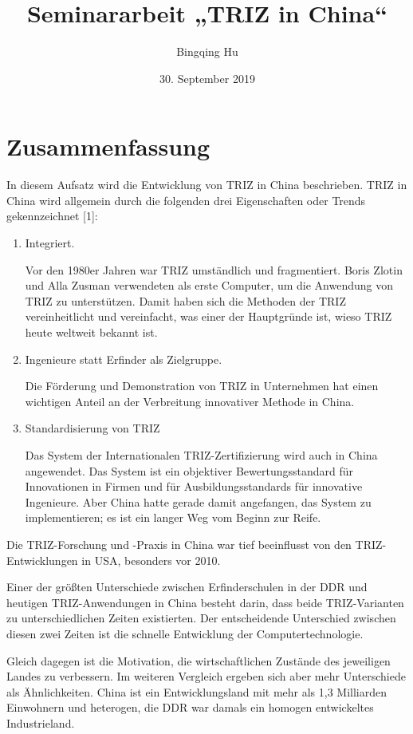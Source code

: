 \documentclass[11pt,a4paper]{article}
\title{Seminararbeit „TRIZ in China“}
\author{Bingqing Hu}
\date{30. September 2019}
\begin{document}
\maketitle
{\small \tableofcontents}

\section*{Zusammenfassung}
In diesem Aufsatz wird die Entwicklung von TRIZ in China beschrieben.  TRIZ in
China wird allgemein durch die folgenden drei Eigenschaften oder Trends
gekennzeichnet [1]:
\begin{enumerate}
\item Integriert.
  
Vor den 1980er Jahren war TRIZ umständlich und fragmentiert. Boris Zlotin und
Alla Zusman verwendeten als erste Computer, um die Anwendung von TRIZ zu
unterstützen.  Damit haben sich die Methoden der TRIZ vereinheitlicht und
vereinfacht, was einer der Hauptgründe ist, wieso TRIZ heute weltweit bekannt
ist.
\item Ingenieure statt Erfinder als Zielgruppe.
  
Die Förderung und Demonstration von TRIZ in Unternehmen hat einen wichtigen
Anteil an der Verbreitung innovativer Methode in China.
\item Standardisierung von TRIZ
  
Das System der Internationalen TRIZ-Zertifizierung wird auch in China
angewendet. Das System ist ein objektiver Bewertungsstandard für Innovationen
in Firmen und für Ausbildungsstandards für innovative Ingenieure. Aber China
hatte gerade damit angefangen, das System zu implementieren; es ist ein langer
Weg vom Beginn zur Reife.
\end{enumerate}

Die TRIZ-Forschung und -Praxis in China war tief beeinflusst von den
TRIZ-Entwicklungen in USA, besonders vor 2010.

Einer der größten Unterschiede zwischen Erfinderschulen in der DDR und
heutigen TRIZ-Anwendungen in China besteht darin, dass beide TRIZ-Varianten zu
unterschiedlichen Zeiten existierten.  Der entscheidende Unterschied zwischen
diesen zwei Zeiten ist die schnelle Entwicklung der Computertechnologie.

Gleich dagegen ist die Motivation, die wirtschaftlichen Zustände des
jeweiligen Landes zu verbessern.  Im weiteren Vergleich ergeben sich aber mehr
Unterschiede als Ähnlichkeiten. China ist ein Entwicklungsland mit mehr als
1,3 Milliarden Einwohnern und heterogen, die DDR war damals ein homogen
entwickeltes Industrieland.
\end{document}
